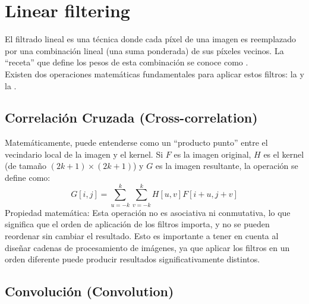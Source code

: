 \section{Linear filtering}

\noindent
El filtrado lineal es una técnica donde cada píxel de una imagen es reemplazado por una combinación lineal (una suma ponderada) de sus píxeles vecinos. La ``receta'' que define los pesos de esta combinación se conoce como . \\

\noindent
Existen dos operaciones matemáticas fundamentales para aplicar estos filtros: la  y la .

\subsection{Correlación Cruzada (Cross-correlation)}
\noindent
Matemáticamente, puede entenderse como un ``producto punto'' entre el vecindario local de la imagen y el kernel. Si $F$ es la imagen original, $H$ es el kernel (de tamaño $(2k+1) \times (2k+1)$) y $G$ es la imagen resultante, la operación se define como:
\begin{equation*}
    G[i,j]= \sum_{u=-k}^{k} \sum_{v=-k}^{k} H[u,v]F[i+u,j+v]
\end{equation*}
\noindent
Propiedad matemática: Esta operación no es asociativa ni conmutativa, lo que significa que el orden de aplicación de los filtros importa, y no se pueden reordenar sin cambiar el resultado. Esto es importante a tener en cuenta al diseñar cadenas de procesamiento de imágenes, ya que aplicar los filtros en un orden diferente puede producir resultados significativamente distintos.

\subsection{Convolución (Convolution)}

